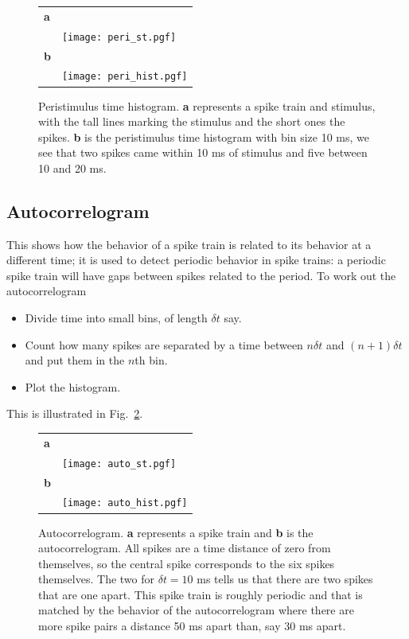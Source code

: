\documentclass[11pt,a4paper]{scrartcl}
\begin{document}
\begin{figure}
\begin{center}
\begin{tabular}{ll}
\textbf{a}&\\
&\texttt{[image: peri\_st.pgf]}\\[1cm]
\textbf{b}&\\
&\texttt{[image: peri\_hist.pgf]}
\end{tabular}
\end{center}
\caption{Peristimulus time histogram. \textbf{a} represents a spike
  train and stimulus, with the tall lines marking the stimulus and the
  short ones the spikes. \textbf{b} is the peristimulus time histogram
  with bin size 10 ms, we see that two spikes came within 10 ms of
  stimulus and five between 10 and 20 ms.\label{peri}}
\end{figure}

\subsection*{Autocorrelogram}
This shows how the behavior of a spike train is related to its
behavior at a different time; it is used to detect periodic behavior
in spike trains: a periodic spike train will have gaps between spikes
related to the period. To work out the autocorrelogram
\begin{itemize}
\item Divide time into small bins, of length $\delta t$ say. 
\item Count how many spikes are separated by a time between $n\delta
  t$ and $(n+1)\delta t$ and put them in the $n$th bin.
\item Plot the histogram.
\end{itemize}
This is illustrated in Fig.~\ref{auto}.

\begin{figure}
\begin{center}
\begin{tabular}{ll}
\textbf{a}&\\
&\texttt{[image: auto\_st.pgf]}\\[1cm]
\textbf{b}&\\
&\texttt{[image: auto\_hist.pgf]}
\end{tabular}
\end{center}
\caption{Autocorrelogram. \textbf{a} represents a spike train and
  \textbf{b} is the autocorrelogram. All spikes are a time distance of
  zero from themselves, so the central spike corresponds to the six
  spikes themselves.  The two for $\delta t=10$ ms tells us that there are
  two spikes that are one apart. This spike train is roughly periodic
  and that is matched by the behavior of the autocorrelogram where
  there are more spike pairs a distance 50 ms apart than, say 30 ms
  apart.\label{auto}}
\end{figure}
\end{document}
